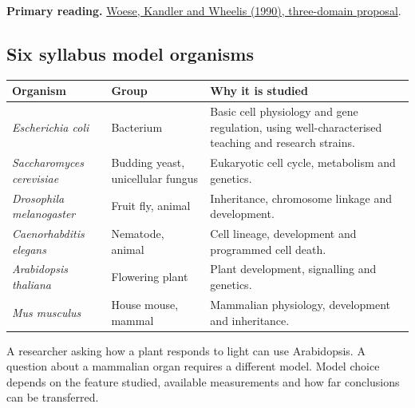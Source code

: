 \documentclass[12pt,a4paper]{article}
\begin{document}
\textbf{Primary reading.} \href{https://pubmed.ncbi.nlm.nih.gov/2112744/}{Woese, Kandler and Wheelis (1990), three-domain proposal}.
\subsection{Six syllabus model organisms}
\par\vspace{5pt}
\begingroup
\setlength{\extrarowheight}{1pt}
\noindent\begin{tabularx}{\linewidth}{|B{4.2cm}|Y|Y|}
\hline
\textbf{Organism} & \textbf{Group} & \textbf{Why it is studied} \\ \hline
\textit{Escherichia coli} & Bacterium & Basic cell physiology and gene regulation, using well-characterised teaching and research strains. \\ \hline
\textit{Saccharomyces cerevisiae} & Budding yeast, unicellular fungus & Eukaryotic cell cycle, metabolism and genetics. \\ \hline
\textit{Drosophila melanogaster} & Fruit fly, animal & Inheritance, chromosome linkage and development. \\ \hline
\textit{Caenorhabditis elegans} & Nematode, animal & Cell lineage, development and programmed cell death. \\ \hline
\textit{Arabidopsis thaliana} & Flowering plant & Plant development, signalling and genetics. \\ \hline
\textit{Mus musculus} & House mouse, mammal & Mammalian physiology, development and inheritance. \\ \hline
\end{tabularx}\par
\endgroup
\begin{tcolorbox}[examplebox, title={Choose a model for a question}]
A researcher asking how a plant responds to light can use Arabidopsis. A question about a mammalian organ requires a different model. Model choice depends on the feature studied, available measurements and how far conclusions can be transferred.
\end{tcolorbox}
\end{document}
